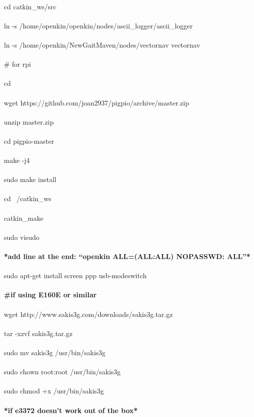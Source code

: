 \documentclass{report}
\begin{document}
\\
cd catkin\_ws/src\\
\\
ln -s /home/openkin/openkin/nodes/ascii\_logger/ascii\_logger\\
\\
ln -s /home/openkin/NewGaitMaven/nodes/vectornav vectornav \\
\\
\# for rpi \\
\\cd\\
\\
wget https://github.com/joan2937/pigpio/archive/master.zip\\
\\
unzip master.zip \\
\\
cd pigpio-master \\
\\
make -j4 \\
\\
sudo make install\\
\\
cd ~/catkin\_ws \\
\\
catkin\_make\\
\\
sudo visudo \\
\\
\textbf{*add line at the end: “openkin ALL=(ALL:ALL) NOPASSWD: ALL”*}\\
\\
sudo apt-get install screen ppp usb-modeswitch\\
\\
\textbf{\#if using E160E or similar }\\
\\
wget http://www.sakis3g.com/downloads/sakis3g.tar.gz\\
\\
tar -xzvf sakis3g.tar.gz\\
\\
sudo mv sakis3g /usr/bin/sakis3g \\
\\
sudo chown root:root /usr/bin/sakis3g\\
\\
sudo chmod +x /usr/bin/sakis3g \\
\\
\textbf{*if e3372 doesn’t work out of the box*}\\
\\
\end{document}
